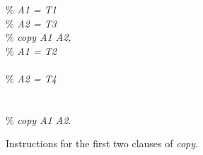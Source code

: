 \begin{figure}
\begin{tabbing}
\>                                  \> \%  {\it A1 = T1} \\
\>                                  \> \%  {\it A2 = T3} \\
\>                               \> \%  {\it copy A1 A2, } \\
\>                                 \> \%  {\it A1 = T2} \\
\>                                  \\
\>                                 \> \%  {\it A2 = T4} \\
\>                                  \\
\>                           \\
\>                                  \> \%  {\it copy A1 A2.}
\end{tabbing}
\caption{Instructions for the first two clauses of {\it copy}.}\label{fig:copy_1}
\end{figure}

